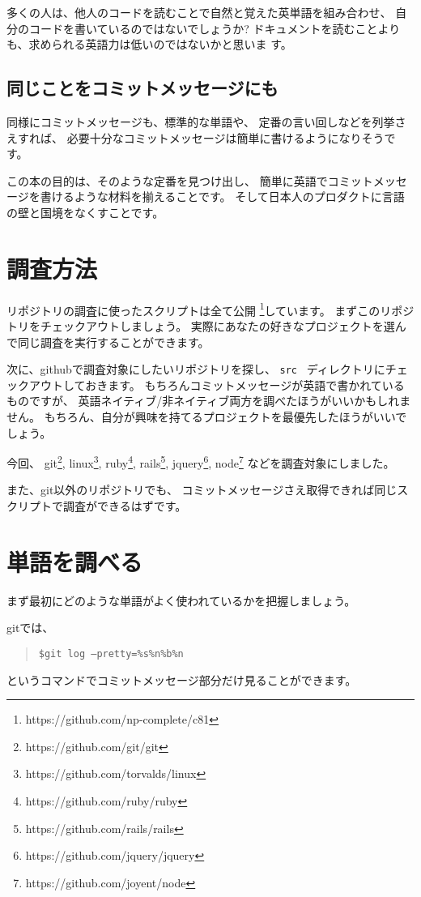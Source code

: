 \documentclass{jarticle}
\begin{document}
多くの人は、他人のコードを読むことで自然と覚えた英単語を組み合わせ、
自分のコードを書いているのではないでしょうか?
ドキュメントを読むことよりも、求められる英語力は低いのではないかと思いま
す。
\subsection{同じことをコミットメッセージにも}
同様にコミットメッセージも、標準的な単語や、
定番の言い回しなどを列挙さえすれば、
必要十分なコミットメッセージは簡単に書けるようになりそうです。

この本の目的は、そのような定番を見つけ出し、
簡単に英語でコミットメッセージを書けるような材料を揃えることです。
そして日本人のプロダクトに言語の壁と国境をなくすことです。

\newpage
\section{調査方法}
リポジトリの調査に使ったスクリプトは全て公開
\footnote{https://github.com/np-complete/c81}しています。
まずこのリポジトリをチェックアウトしましょう。
実際にあなたの好きなプロジェクトを選んで同じ調査を実行することができます。

次に、githubで調査対象にしたいリポジトリを探し、
{\tt src } ディレクトリにチェックアウトしておきます。
もちろんコミットメッセージが英語で書かれているものですが、
英語ネイティブ/非ネイティブ両方を調べたほうがいいかもしれません。
もちろん、自分が興味を持てるプロジェクトを最優先したほうがいいでしょう。

今回、
git\footnote{https://github.com/git/git},
linux\footnote{https://github.com/torvalds/linux},
ruby\footnote{https://github.com/ruby/ruby},
rails\footnote{https://github.com/rails/rails},
jquery\footnote{https://github.com/jquery/jquery},
node\footnote{https://github.com/joyent/node}
などを調査対象にしました。

また、git以外のリポジトリでも、
コミットメッセージさえ取得できれば同じスクリプトで調査ができるはずです。

\section{単語を調べる}
まず最初にどのような単語がよく使われているかを把握しましょう。

gitでは、
\begin{quote}
{\tt \$git log --pretty=\%s\%n\%b\%n}
\end{quote}

というコマンドでコミットメッセージ部分だけ見ることができます。
\end{document}
